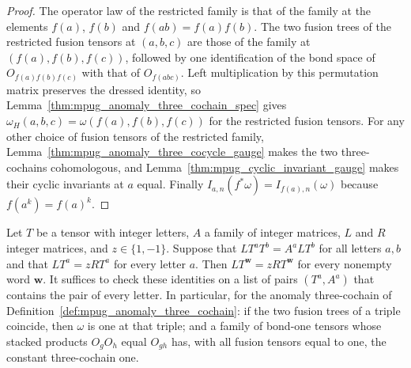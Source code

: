 \begin{proof}\leanok
    The operator law of the restricted family is that of the family at the
    elements $f(a)$, $f(b)$ and $f(ab)=f(a)f(b)$. The two fusion trees of the
    restricted fusion tensors at $(a,b,c)$ are those of the family at
    $(f(a),f(b),f(c))$, followed by one identification of the bond space of
    $O_{f(a)f(b)f(c)}$ with that of $O_{f(abc)}$. Left multiplication by this
    permutation matrix preserves the dressed identity, so
    Lemma~\ref{thm:mpug_anomaly_three_cochain_spec} gives
    $\omega_H(a,b,c)=\omega(f(a),f(b),f(c))$ for the restricted fusion
    tensors. For any other choice of fusion tensors of the restricted family,
    Lemma~\ref{thm:mpug_anomaly_three_cocycle_gauge} makes the two
    three-cochains cohomologous, and
    Lemma~\ref{thm:mpug_cyclic_invariant_gauge} makes their cyclic
    invariants at $a$ equal. Finally $I_{a,n}(f^*\omega)=I_{f(a),n}(\omega)$
    because $f(a^k)=f(a)^k$.
\end{proof}

\begin{lemma}%
    \label{thm:mpug_omega_integer_certificate}
    \leanok
    Let $T$ be a tensor with integer letters, $A$ a family of integer
    matrices, $L$ and $R$ integer matrices, and $z\in\{1,-1\}$. Suppose
    that $LT^aT^b=A^aLT^b$ for all letters $a,b$ and that $LT^a=zRT^a$ for
    every letter $a$. Then $LT^{\mathbf w}=zRT^{\mathbf w}$ for every nonempty
    word $\mathbf w$. It suffices to check these identities on a list of pairs
    $(T^a,A^a)$ that contains the pair of every letter. In particular, for the
    anomaly three-cochain of Definition~\ref{def:mpug_anomaly_three_cochain}:
    if the two fusion trees of a triple coincide, then $\omega$ is one at
    that triple; and a family of bond-one tensors whose stacked products
    $O_gO_h$ equal $O_{gh}$ has, with all fusion tensors equal to one, the
    constant three-cochain one.
\end{lemma}

